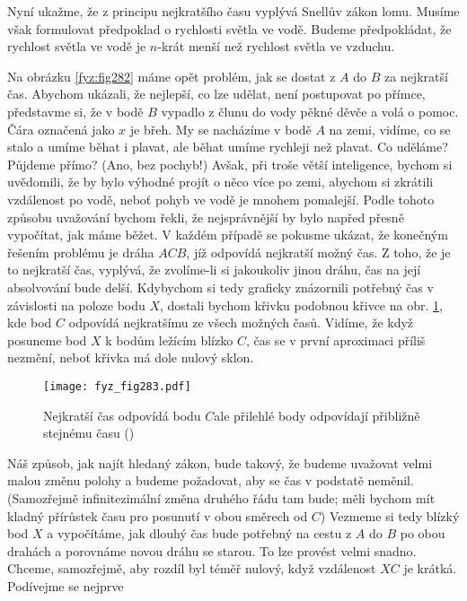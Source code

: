     Nyní ukažme, že z principu nejkratšího času vyplývá Snellův zákon lomu. Musíme však formulovat 
    předpoklad o rychlosti světla ve vodě. Budeme předpokládat, že rychlost světla ve vodě je 
    \(n\)-krát menší než rychlost světla ve vzduchu.
    
    Na obrázku \ref{fyz:fig282} máme opět problém, jak se dostat z \(A\) do \(B\) za nejkratší čas. 
    Abychom ukázali, že nejlepší, co lze udělat, není postupovat po přímce, představme si, že v 
    bodě \(B\) vypadlo z člunu do vody pěkné děvče a volá o pomoc. Čára označená jako \(x\) je 
    břeh. My se nacházíme v bodě \(A\) na zemi, vidíme, co se stalo a umíme běhat i plavat, ale 
    běhat umíme rychleji než plavat. Co uděláme? Půjdeme přímo? (Ano, bez pochyb!) Avšak, při troše 
    větší inteligence, bychom si uvědomili, že by bylo výhodné projít o něco více po zemi, abychom 
    si zkrátili vzdálenost po vodě, neboť pohyb ve vodě je mnohem pomalejší. Podle tohoto způsobu 
    uvažování bychom řekli, že nejsprávnější by bylo napřed přesně vypočítat, jak máme běžet. V 
    každém případě se pokusme ukázat, že konečným řešením problému je dráha \(ACB\), jíž odpovídá 
    nejkratší možný čas. Z toho, že je to nejkratší čas, vyplývá, že zvolíme-li si jakoukoliv jinou 
    dráhu, čas na její absolvování bude delší. Kdybychom si tedy graficky znázornili potřebný čas v 
    závislosti na poloze bodu \(X\), dostali bychom křivku podobnou křivce na obr. 
    \ref{fyz:fig283}, kde bod \(C\) odpovídá nejkratšímu ze všech možných časů. Vidíme, že když 
    posuneme bod \(X\) k bodům ležícím blízko \(C\), čas se v první aproximaci příliš nezmění, 
    neboť křivka má dole nulový sklon.
    \begin{figure}[ht!] %
      \centering
      \texttt{[image: fyz\_fig283.pdf]}
      \caption{Nejkratší čas odpovídá bodu \(C\)ale přilehlé body odpovídají přibližně stejnému času
               (\cite[s.~349]{Feynman01})}
      \label{fyz:fig283}
    \end{figure}
    Náš způsob, jak najít hledaný zákon, bude takový, že budeme uvažovat velmi malou změnu polohy a 
    budeme požadovat, aby se čas v podstatě neměnil. (Samozřejmě infinitezimální změna druhého řádu 
    tam bude; měli bychom mít kladný přírůstek času pro posunutí v obou směrech od \(C\)) Vezmeme 
    si tedy blízký bod \(X\) a vypočítáme, jak dlouhý čas bude potřebný na cestu z \(A\) do \(B\) 
    po obou drahách a porovnáme novou dráhu se starou. To lze provést velmi snadno. Chceme, 
    samozřejmě, aby rozdíl byl téměř nulový, když vzdálenost \(XC\) je krátká. Podívejme se nejprve 
